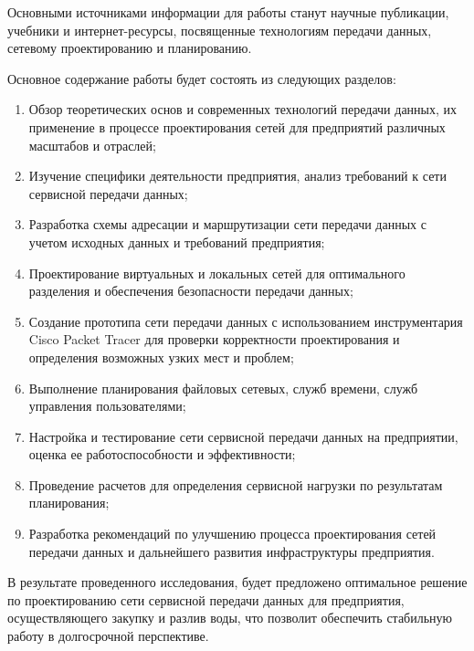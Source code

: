 Основными источниками информации для работы станут научные публикации, учебники и интернет-ресурсы, посвященные технологиям передачи данных, сетевому проектированию и планированию.

Основное содержание работы будет состоять из следующих разделов:

\begin{enumerate}
    \item Обзор теоретических основ и современных технологий передачи данных, их применение в процессе проектирования сетей для предприятий различных масштабов и отраслей;
    \item Изучение специфики деятельности предприятия, анализ требований к сети сервисной передачи данных;
    \item Разработка схемы адресации и маршрутизации сети передачи данных с учетом исходных данных и требований предприятия;
    \item Проектирование виртуальных и локальных сетей для оптимального разделения и обеспечения безопасности передачи данных;
    \item Создание прототипа сети передачи данных с использованием инструментария Cisco Packet Tracer для проверки корректности проектирования и определения возможных узких мест и проблем;
    \item Выполнение планирования файловых сетевых, служб времени, служб управления пользователями;
    \item Настройка и тестирование сети сервисной передачи данных на предприятии, оценка ее работоспособности и эффективности;
	\item Проведение расчетов для определения сервисной нагрузки по результатам планирования;
    \item Разработка рекомендаций по улучшению процесса проектирования сетей передачи данных и дальнейшего развития инфраструктуры предприятия.
\end{enumerate}

В результате проведенного исследования, будет предложено оптимальное решение по проектированию сети сервисной передачи данных для предприятия, осуществляющего закупку и разлив воды, что позволит обеспечить стабильную работу в долгосрочной перспективе.

